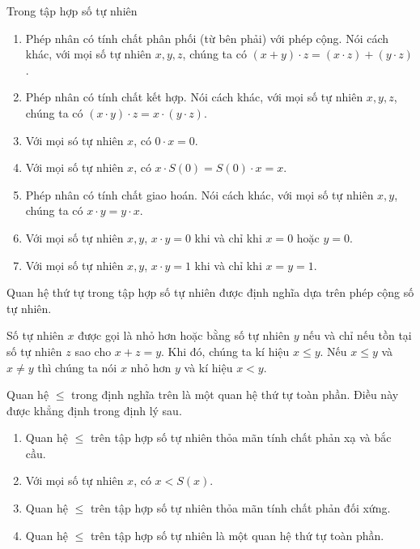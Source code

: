 \begin{theorem}\label{theorem:property-of-natural-numbers-multiplication}
    Trong tập hợp số tự nhiên
    \begin{enumerate}[label={(\roman*)}]
        \item Phép nhân có tính chất phân phối (từ bên phải) với phép cộng. Nói cách khác, với mọi số tự nhiên $x, y, z$, chúng ta có $(x + y)\cdot z = (x\cdot z) + (y\cdot z)$.
        \item Phép nhân có tính chất kết hợp. Nói cách khác, với mọi số tự nhiên $x, y, z$, chúng ta có $(x \cdot y) \cdot z = x \cdot (y \cdot z)$.
        \item Với mọi só tự nhiên $x$, có $0\cdot x = 0$.
        \item Với mọi số tự nhiên $x$, có $x\cdot S(0) = S(0) \cdot x = x$.
        \item Phép nhân có tính chất giao hoán. Nói cách khác, với mọi số tự nhiên $x, y$, chúng ta có $x \cdot y = y \cdot x$.
        \item Với mọi số tự nhiên $x, y$, $x\cdot y = 0$ khi và chỉ khi $x = 0$ hoặc $y = 0$.
        \item Với mọi số tự nhiên $x, y$, $x\cdot y = 1$ khi và chỉ khi $x = y = 1$.
    \end{enumerate}
\end{theorem}

Quan hệ thứ tự trong tập hợp số tự nhiên được định nghĩa dựa trên phép cộng số tự nhiên.
\begin{definition}
    Số tự nhiên $x$ được gọi là nhỏ hơn hoặc bằng số tự nhiên $y$ nếu và chỉ nếu tồn tại số tự nhiên $z$ sao cho $x + z = y$. Khi đó, chúng ta kí hiệu $x\leq y$. Nếu $x\leq y$ và $x\ne y$ thì chúng ta nói $x$ nhỏ hơn $y$ và kí hiệu $x < y$.
\end{definition}

Quan hệ $\leq$ trong định nghĩa trên là một quan hệ thứ tự toàn phần. Điều này được khẳng định trong định lý sau.
\begin{theorem}
    \begin{enumerate}[label={(\roman*)}]
        \item Quan hệ $\leq$ trên tập hợp số tự nhiên thỏa mãn tính chất phản xạ và bắc cầu.
        \item Với mọi số tự nhiên $x$, có $x < S(x)$.
        \item Quan hệ $\leq$ trên tập hợp số tự nhiên thỏa mãn tính chất phản đối xứng.
        \item Quan hệ $\leq$ trên tập hợp số tự nhiên là một quan hệ thứ tự toàn phần.
    \end{enumerate}
\end{theorem}

